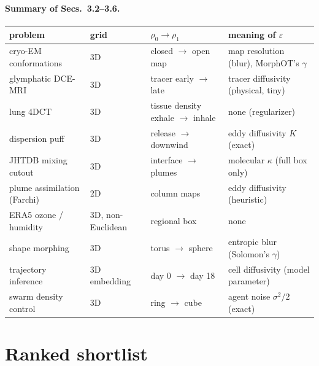 \documentclass[11pt]{article}
\newcommand{\eps}{\varepsilon}
\begin{document}
\paragraph{Summary of Secs.~3.2--3.6.}
\begin{center}\small
\begin{tabular}{llll}\toprule
problem & grid & $\rho_0\to\rho_1$ & meaning of $\eps$\\\midrule
cryo-EM conformations & 3D & closed $\to$ open map & map resolution (blur), MorphOT's $\gamma$\\
glymphatic DCE-MRI & 3D & tracer early $\to$ late & tracer diffusivity (physical, tiny)\\
lung 4DCT & 3D & tissue density exhale $\to$ inhale & none (regularizer)\\
dispersion puff & 3D & release $\to$ downwind & eddy diffusivity $K$ (exact)\\
JHTDB mixing cutout & 3D & interface $\to$ plumes & molecular $\kappa$ (full box only)\\
plume assimilation (Farchi) & 2D & column maps & eddy diffusivity (heuristic)\\
ERA5 ozone / humidity & 3D, non-Euclidean & regional box & none\\
shape morphing & 3D & torus $\to$ sphere & entropic blur (Solomon's $\gamma$)\\
trajectory inference & 3D embedding & day 0 $\to$ day 18 & cell diffusivity (model parameter)\\
swarm density control & 3D & ring $\to$ cube & agent noise $\sigma^2/2$ (exact)\\
\bottomrule
\end{tabular}
\end{center}

\section{Ranked shortlist}
\label{sec:shortlist}
\end{document}
